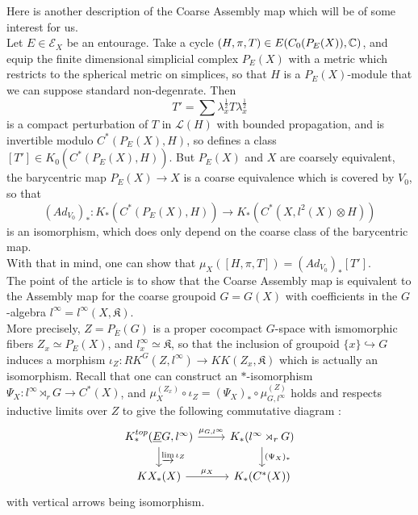 Here is another description of the Coarse Assembly map which will be of some interest for us.\\

Let $E\in \mathcal E_X$ be an entourage. Take a cycle $(H,\pi, T)\in E(C_0(P_E(X)), \mathbb C)$, and equip the finite dimensional simplicial complex $P_E(X)$ with a metric which restricts to the spherical metric on simplices, so that $H$ is a $P_E(X)$-module that we can suppose standard non-degenrate. Then 
\[T'=\sum \lambda_x^{\frac{1}{2}} T \lambda_x^{\frac{1}{2}} \] 
is a compact perturbation of $T$ in $\mathcal L(H)$ with bounded propagation, and is invertible modulo $C^*(P_E(X),H)$, so defines a class $[T']\in K_0(C^*(P_E(X),H))$. But $P_E(X)$ and $X$ are coarsely equivalent, the barycentric map $P_E(X)\rightarrow X$ is a coarse equivalence which is covered by $V_0$, so that 
\[(Ad_{V_0})_* : K_*(C^*(P_E(X),H))\rightarrow K_*(C^*(X,l^2(X)\otimes H))\]
is an isomorphism, which does only depend on the coarse class of the barycentric map.\\

With that in mind, one can show that $\mu_{X}([H,\pi,T])=(Ad_{V_0})_*[T']$.\\

The point of the article \cite{SkTuYu} is to show that the Coarse Assembly map is equivalent to the Assembly map for the coarse groupoid $G=G(X)$ with coefficients in the $G$-algebra $l^\infty=l^\infty(X,\mathfrak K)$. \\

More precisely, $Z=P_{\overline E}(G)$ is a proper cocompact $G$-space with ismomorphic fibers $Z_x\simeq P_E(X)$, and $l^\infty_x \simeq \mathfrak K$, so that the inclusion of groupoid $\{x\}\hookrightarrow G $ induces a morphism $\iota_Z : RK^G(Z,l^\infty)\rightarrow KK(Z_x,\mathfrak K)$ which is actually an isomorphism. Recall that one can construct an $*$-isomorphism $\Psi_X: l^\infty \rtimes_r G\rightarrow C^*(X)$, and $\mu_X^{(Z_x)}\circ \iota_Z = (\Psi_X)_*\circ \mu_{G,l^\infty}^{(Z)}$ holds and respects inductive limits over $Z$ to give the following commutative diagram :
\[\begin{tikzcd}
K_*^{top}(\underline E G, l^\infty) \arrow{r}{\mu_{G,l^\infty}}\arrow{d}{\varinjlim \iota_Z} & K_*(l^\infty\rtimes_r G)\arrow{d}{(\Psi_X)_*} \\
KX_*(X)\arrow{r}{\mu_X} & K_*(C^*(X))
\end{tikzcd}\]  
with vertical arrows being isomorphism.\\


